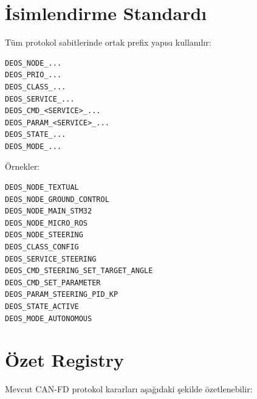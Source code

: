 \documentclass[a4paper,10pt]{article}
\begin{document}
\section{İsimlendirme Standardı}

Tüm protokol sabitlerinde ortak prefix yapısı kullanılır:

\begin{verbatim}
DEOS_NODE_...
DEOS_PRIO_...
DEOS_CLASS_...
DEOS_SERVICE_...
DEOS_CMD_<SERVICE>_...
DEOS_PARAM_<SERVICE>_...
DEOS_STATE_...
DEOS_MODE_...
\end{verbatim}

Örnekler:

\begin{verbatim}
DEOS_NODE_TEXTUAL
DEOS_NODE_GROUND_CONTROL
DEOS_NODE_MAIN_STM32
DEOS_NODE_MICRO_ROS
DEOS_NODE_STEERING
DEOS_CLASS_CONFIG
DEOS_SERVICE_STEERING
DEOS_CMD_STEERING_SET_TARGET_ANGLE
DEOS_CMD_SET_PARAMETER
DEOS_PARAM_STEERING_PID_KP
DEOS_STATE_ACTIVE
DEOS_MODE_AUTONOMOUS
\end{verbatim}


\section{Özet Registry}

Mevcut CAN-FD protokol kararları aşağıdaki şekilde özetlenebilir:
\end{document}
